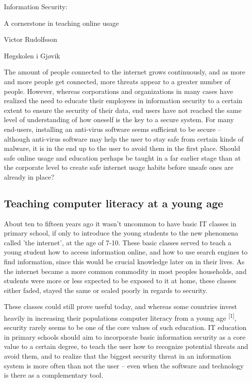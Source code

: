 \documentclass[twocolumn,letterpaper]{article}
\title{}
\author{}
\date{2012-10-21}
\begin{document}
\clearpage\setcounter{page}{1}\pagestyle{Standard}
\thispagestyle{FirstPage}
{\centering
Information Security:
\par}

{\centering
A cornerstone in teaching online usage
\par}

\clearpage
\bigskip

{\centering
Victor Rudolfsson
\par}

{\centering
Høgskolen i Gjøvik
\par}


\bigskip

The amount of people connected to the internet grows continuously, and as more and more people get connected, more
threats appear to a greater number of people. However, whereas corporations and organizations in many cases have
realized the need to educate their employees in information security to a certain extent to ensure the security of
their data, end users have not reached the same level of understanding of how oneself is the key to a secure system.
For many end-users, installing an anti-virus software seems sufficient to be secure – although anti-virus software may
help the user to stay safe from certain kinds of malware, it is in the end up to the user to avoid them in the first
place. Should safe online usage and education perhaps be taught in a far earlier stage than at the corporate level to
create safe internet usage habits before unsafe ones are already in place?

\subsection[Teaching computer literacy at a young age]{\bfseries \textup{Teaching computer literacy at a young age}}
About ten to fifteen years ago it wasn't uncommon to have basic IT classes in primary school, if only to introduce the
young students to the new phenomena called 'the internet', at the age of 7-10. These basic classes served to teach a
young student how to access information online, and how to use search engines to find information, since this would be
crucial knowledge later on in their lives. As the internet became a more common commodity in most peoples households,
and students were more or less expected to be exposed to it at home, these classes either faded, stayed the same or
scaled poorly in regards to security.

These classes could still prove useful today, and whereas some countries invest heavily in increasing their populations
computer literacy from a young age \textsuperscript{[1]}, security rarely seems to be one of the core values of such
education. IT education in primary schools should aim to incorporate basic information security as a core value to a
certain degree, to teach the user how to recognize potential threats and avoid them, and to realize that the biggest
security threat in an information system is more often than not the user – even when the software and technology is
there as a complementary tool.
\end{document}
